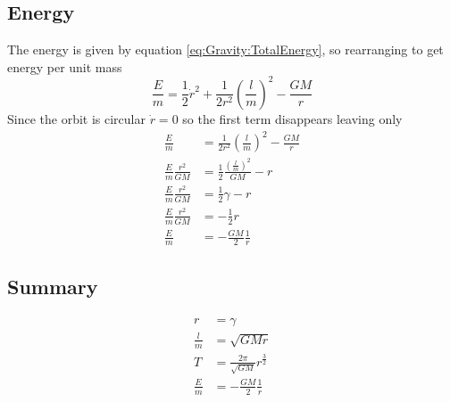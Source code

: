 \subsection{Energy}
The energy is given by equation \ref{eq:Gravity:TotalEnergy}, so rearranging to get energy per unit mass
\begin{equation}
\frac{E}{m}=\frac{1}{2} \dot{r}^2 +\frac{1}{2r^2} \left(\frac{l}{m}\right)^2- \frac{GM}{r}
\end{equation}
Since the orbit is circular $\dot{r}=0$ so the first term disappears leaving only
\begin{align}
\frac{E}{m}&=\frac{1}{2r^2} \left(\frac{l}{m}\right)^2- \frac{GM}{r}\nonumber \\
\frac{E}{m}\frac{r^2}{GM}&=\frac{1}{2} \frac{\left(\frac{l}{m}\right)^2}{GM}- r \nonumber \\
\frac{E}{m}\frac{r^2}{GM}&=\frac{1}{2} \gamma-r \nonumber \\
\frac{E}{m}\frac{r^2}{GM}&=-\frac{1}{2}r \nonumber \\
\frac{E}{m}&=-\frac{GM}{2}\frac{1}{r}
\end{align}

\begin{framed}
\subsection{Summary}
\begin{align*}
r&=\gamma \\
\frac{l}{m}&=\sqrt{GMr}\\
T&=\frac{2\pi}{\sqrt{GM}}r^{\frac{3}{2}}\\
\frac{E}{m}&=-\frac{GM}{2}\frac{1}{r}
\end{align*}
\end{framed}
